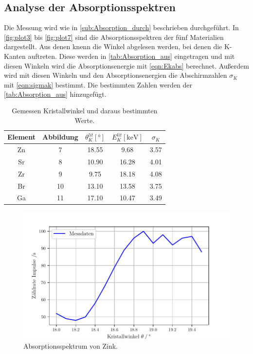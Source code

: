 \subsection{Analyse der Absorptionsspektren} %
\label{sub:Absorption_aus}
Die Messung wird wie in \autoref{sub:Absorption_durch} beschrieben durchgeführt.
In \autoref{fig:plot3} bis \ref{fig:plot7} sind die Absorptionsspektren der fünf Materialien dargestellt.
Aus denen knenn die Winkel abgelesen werden, bei denen die K-Kanten auftreten.
Diese werden in \autoref{tab:Absorption_aus} eingetragen und mit diesen Winkeln wird die Absorptionsenergie mit \autoref{eqn:Ekabs} berechnet.
Außerdem wird mit diesen Winkeln und den Absorptionsenergien die Abschirmzahlen $\sigma_K$ mit \autoref{eqn:sigmak} bestimmt.
Die bestimmten Zahlen werden der \autoref{tab:Absorption_aus} hinzugefügt.

\begin{table}[H]
  \centering
  \caption{Gemessen Kristallwinkel und daraus bestimmten Werte.}
  \label{tab:Absorption_aus}
  \begin{tabular}{c S[table-format=2.0] S S S[table-format=1.2] }
  \toprule
  {Element} & {Abbildung} & {$\theta_{K}^{lit} [\si{\degree}]$} & {$E_{K}^{lit} [\si{\kilo\electronvolt}]$}& {$\sigma_K$}\\
  \midrule
    Zn & 7  & 18.55 & 9.68  & 3.57 \\
    Sr & 8  & 10.90 & 16.28 & 4.01 \\
    Zr & 9  &  9.75 & 18.18 & 4.08 \\
    Br & 10 & 13.10 & 13.58 & 3.75 \\
    Ga & 11 & 17.10 & 10.47 & 3.49 \\ 
  \bottomrule
  \end{tabular}
\end{table}

\begin{figure}[H]
  \centering
  \includegraphics[width=\textwidth]{build/plot3.pdf}
  \caption{Absorptionsspektrum von Zink.}
  \label{fig:plot3}
\end{figure}

